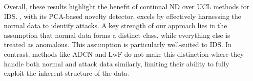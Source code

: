 Overall, these results highlight the benefit of continual ND over UCL methods for IDS. \Design{}, with its PCA-based novelty detector, excels by effectively harnessing the normal data to identify attacks. A key strength of our approach lies in the assumption that normal data forms a distinct class, while everything else is treated as anomalous. This assumption is particularly well-suited to IDS. In contrast, methods like ADCN and LwF do not make this distinction where they handle both normal and attack data similarly, limiting their ability to fully exploit the inherent structure of the data. 




